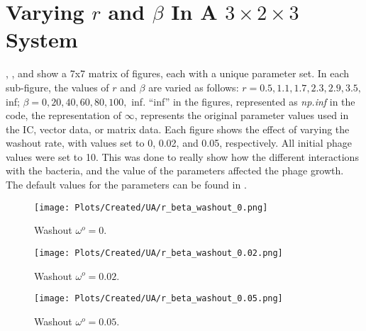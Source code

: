 \section{Varying $r$ and $\beta$ In A $3\times 2\times 3$ System}
, , and  show a 7x7 matrix of figures, each with a unique parameter set. 
In each sub-figure, the values of $r$ and $\beta$ are varied as follows: $r = 0.5, 1.1, 1.7, 2.3, 2.9, 3.5,$ inf; $\beta = 0, 20, 40, 60, 80, 100,$ inf. 
“inf” in the figures, represented as \textit{np.inf} in the code, the representation of $\infty$,  represents the original parameter values used in the IC, vector data, or matrix data. 
Each figure shows the effect of varying the washout rate, with values set to 0, 0.02, and 0.05, respectively.
All initial phage values were set to 10. 
This was done to really show how the different interactions with the bacteria, and the value of the parameters affected the phage growth. 
The default values for the parameters can be found in . 
\begin{figure}[]
    \texttt{[image: Plots/Created/UA/r\_beta\_washout\_0.png]}
    \centering
    \caption{
        Washout $\omega^o=0$. 
    }
    \label{fig:created:r_beta_washout_0}
\end{figure}

\begin{figure}[]
    \texttt{[image: Plots/Created/UA/r\_beta\_washout\_0.02.png]}
    \centering
    \caption{
        Washout $\omega^o=0.02$. 
    }
    \label{fig:created:r_beta_washout_0.02}
\end{figure}

\begin{figure}[]
    \texttt{[image: Plots/Created/UA/r\_beta\_washout\_0.05.png]}
    \centering
    \caption{
        Washout $\omega^o=0.05$. 
    }
    \label{fig:created:r_beta_washout_0.05}
\end{figure}